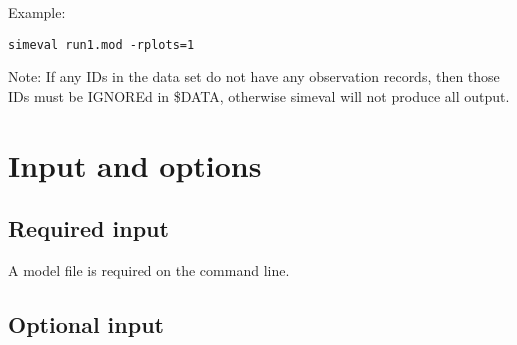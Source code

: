 Example:
\begin{verbatim}
simeval run1.mod -rplots=1
\end{verbatim}
Note: If any IDs in the data set do not have any observation records, then those IDs must be IGNOREd in \$DATA, otherwise simeval will not produce all output.

\section{Input and options}

\subsection{Required input}
A model file is required on the command line.

\subsection{Optional input}

